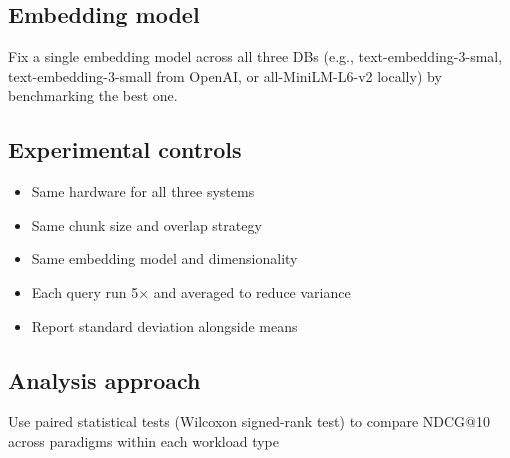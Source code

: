 \documentclass{article}
\begin{document}
\subsection{Embedding model}
Fix a single embedding model across all three DBs (e.g., text-embedding-3-smal, text-embedding-3-small from OpenAI, or all-MiniLM-L6-v2 locally) by benchmarking the best one.

\subsection{Experimental controls}
\begin{itemize}[leftmargin=*]
\item Same hardware for all three systems
\item Same chunk size and overlap strategy
\item Same embedding model and dimensionality
\item Each query run 5× and averaged to reduce variance
\item Report standard deviation alongside means
\end{itemize}

\subsection{Analysis approach}
Use paired statistical tests (Wilcoxon signed-rank test) to compare NDCG@10 across paradigms within each workload type
\end{document}
